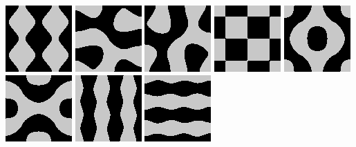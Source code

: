 \includegraphics{o/chladni_017.png}
\includegraphics{o/chladni_018.png}
\includegraphics{o/chladni_019.png}
\includegraphics{o/chladni_020.png}
\includegraphics{o/chladni_021.png}
\includegraphics{o/chladni_022.png}
\includegraphics{o/chladni_023.png}
\includegraphics{o/chladni_024.png}

